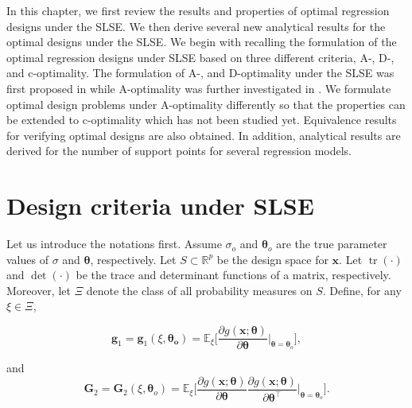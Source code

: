 \documentclass[
]{book}
\theoremstyle{definition}
\theoremstyle{definition}
\theoremstyle{definition}
\theoremstyle{definition}
\theoremstyle{remark}
\begin{document}
In this chapter, we first review the results and properties of optimal regression designs under the SLSE. We then derive several new analytical results for the optimal designs under the SLSE. We begin with recalling the formulation of the optimal regression designs under SLSE based on three different criteria, A-, D-, and c-optimality. The formulation of A-, and D-optimality under the SLSE was first proposed in \citet{gao2014new} while A-optimality was further investigated in \citet{yin2018optimal}. We formulate optimal design problems under A-optimality differently so that the properties can be extended to c-optimality which has not been studied yet. Equivalence results for verifying optimal designs are also obtained. In addition, analytical results are derived for the number of support points for several regression models.

\section{Design criteria under SLSE}\label{design-criteria-under-slse}

Let us introduce the notations first. Assume \(\sigma_o\) and \(\boldsymbol{\theta}_o\) are the true parameter values of \(\sigma\) and \(\boldsymbol{\theta}\), respectively. Let \(S \subset \mathbb{R}^p\) be the design space for \(\boldsymbol{x}\). Let \(\operatorname{tr}(\cdot)\) and \(\det(\cdot)\) be the trace and determinant functions of a matrix, respectively. Moreover, let \(\Xi\) denote the class of all probability measures on \(S\). Define, for any \(\xi\in \Xi\),

\begin{equation*}
\boldsymbol{g}_1=\boldsymbol{g}_1(\xi,\boldsymbol{\theta_o})=\mathbb{E}_{\xi}\bigg[ \frac{\partial g(\boldsymbol{x};\boldsymbol{\theta})}{\partial \boldsymbol{\theta}}\Big|_{\boldsymbol{\theta}=\boldsymbol{\theta}_o} \bigg],
\end{equation*}

and
\begin{equation*}
\boldsymbol{G}_2=\boldsymbol{G}_2(\xi,\boldsymbol{\theta}_o)=\mathbb{E}_{\xi} \bigg[ \frac{\partial g(\boldsymbol{x};\boldsymbol{\theta})}{\partial \boldsymbol{\theta}}\frac{\partial g(\boldsymbol{x};\boldsymbol{\theta})}{\partial \boldsymbol{\theta}^\top}\Big|_{\boldsymbol{\theta}=\boldsymbol{\theta}_o}\bigg].
\end{equation*}
\end{document}
